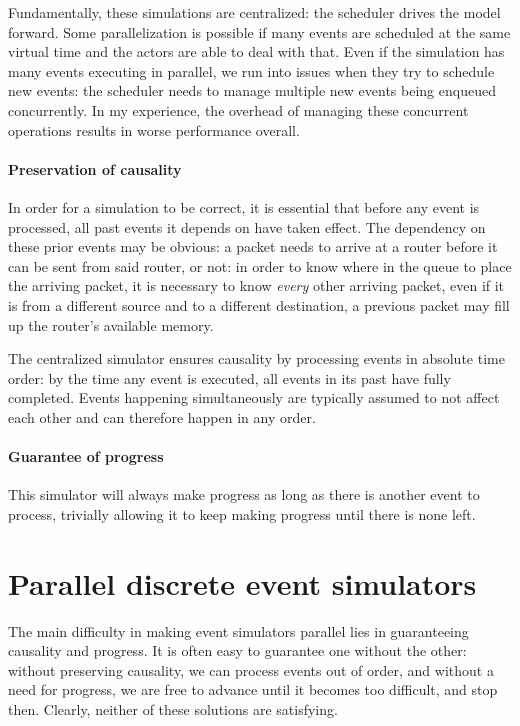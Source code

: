 Fundamentally, these simulations are centralized: the scheduler drives the model forward.
Some parallelization is possible if many events are scheduled at the same virtual time and the actors are able to deal with that.
Even if the simulation has many events executing in parallel, we run into issues when they try to schedule new events: the scheduler needs to manage multiple new events being enqueued concurrently.
In my experience, the overhead of managing these concurrent operations results in worse performance overall.

\paragraph{Preservation of causality}

In order for a simulation to be correct, it is essential that before any event is processed, all past events it depends on have taken effect.
The dependency on these prior events may be obvious: a packet needs to arrive at a router before it can be sent from said router, or not: in order to know where in the queue to place the arriving packet, it is necessary to know \emph{every} other arriving packet, even if it is from a different source and to a different destination, a previous packet may fill up the router's available memory.

The centralized simulator ensures causality by processing events in absolute time order: by the time any event is executed, all events in its past have fully completed.
Events happening simultaneously are typically assumed to not affect each other and can therefore happen in any order.

\paragraph{Guarantee of progress}
This simulator will always make progress as long as there is another event to process, trivially allowing it to keep making progress until there is none left.



\section{Parallel discrete event simulators} \label{pdes}

The main difficulty in making event simulators parallel lies in guaranteeing causality and progress.
It is often easy to guarantee one without the other: without preserving causality, we can process events out of order, and without a need for progress, we are free to advance until it becomes too difficult, and stop then.
Clearly, neither of these solutions are satisfying.

